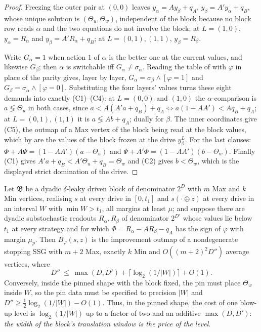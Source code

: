 \begin{proof}
Freezing the outer pair at $(0,0)$ leaves $y_\alpha=Ay_\beta+q_A$,
$y_\beta=A'y_\alpha+q_B$, whose unique solution is $(\Theta_u,\Theta_w)$,
independent of the block because no block row reads $\alpha$ and the two
equations do not involve the block; at $L=(1,0)$, $y_\alpha=R_\alpha$ and
$y_\beta=A'R_\alpha+q_B$; at $L=(0,1),(1,1)$, $y_\beta=R_\beta$.

Write $G_\alpha=1$ when action $1$ of $\alpha$ is the better one at the
current values, and likewise $G_\beta$; then $\alpha$ is switchable iff
$G_\alpha\ne\sigma_\alpha$. Reading the table of  with
$\varphi$ in place of the parity gives, layer by layer,
$G_\alpha=\sigma_\beta\wedge[\varphi=1]$ and
$G_\beta=\sigma_\alpha\wedge[\varphi=0]$. Substituting the four layers'
values turns these eight demands into exactly (C1)--(C4): at $L=(0,0)$ and
$(1,0)$ the $\alpha$-comparison is $a\lessgtr\Theta_u$ in both cases, since
$a<A(A'a+q_B)+q_A\iff a(1-AA')<Aq_B+q_A$; at $L=(0,1),(1,1)$ it is
$a\lessgtr Ab+q_A$; dually for $\beta$. The inner coordinates give (C5), the
outmap of a Max vertex of the block being read at the block values, which by
 are the values of the block frozen at the drive
$y^{L}_\beta$. For the last clauses: $\Phi+A\Psi=(1-AA')(a-\Theta_u)$ and
$\Psi+A'\Phi=(1-AA')(b-\Theta_w)$. Finally (C1) gives
$A'a+q_B<A'\Theta_u+q_B=\Theta_w$ and (C2) gives $b<\Theta_w$, which is the
displayed strict domination of the drive.
\end{proof}

\begin{corollary}\label{rs:cost}
Let $\mathfrak B$ be a dyadic $\delta$-leaky driven block of denominator
$2^{D}$ with $m$ Max and $k$ Min vertices, realising $s$ at every drive in
$[0,t_1]$ and $s(\cdot\oplus z)$ at every drive in an interval $W$ with
$\min W>t_1$, all margins at least $\mu$; and suppose there are dyadic
substochastic readouts $R_\alpha,R_\beta$ of denominator $2^{D'}$ whose values
lie below $t_1$ at every strategy and for which $\Phi=R_\alpha-AR_\beta-q_A$
has the sign of $\varphi$ with margin $\mu_p$. Then $B_\varphi(s,z)$ is the
improvement outmap of a nondegenerate stopping SSG with $m+2$ Max, exactly $k$
Min and $O((m+2)^{2}D'')$ average vertices, where
\[
 D''\ \le\ \max(D,D')+\bigl\lceil\log_2(1/|W|)\bigr\rceil+O(1).
\]
Conversely, inside the pinned shape with the block fixed, the pin must place
$\Theta_w$ inside $W$, so the pin data must be specified to precision $|W|$
and $D''\ge\frac12\log_2(1/|W|)-O(1)$. Thus, in the pinned shape, the cost of
one blow-up level is $\log_2(1/|W|)$ up to a factor of two and an additive
$\max(D,D')$: \emph{the width of the block's translation window is the price
of the level}.
\end{corollary}

